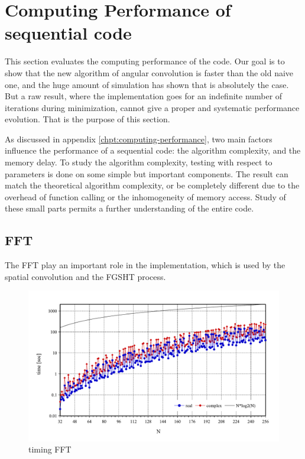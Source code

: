 
\chapter{Computing Performance of sequential code\label{chpt:seq-code-performance}}

This section evaluates the computing performance of the code. Our
goal is to show that the new algorithm of angular convolution is faster
than the old naive one, and the huge amount of simulation has shown
that is absolutely the case. But a raw result, where the implementation
goes for an indefinite number of iterations during minimization, cannot %
give a proper and systematic performance evolution. That is the 
purpose of this section. 

As discussed in appendix \ref{chpt:computing-performance}, two main
factors influence the performance of a sequential code: the
algorithm complexity, and the memory delay. To study the algorithm
complexity, testing with respect to parameters is done on some simple
but important components. The result can match the theoretical algorithm
complexity, or be completely different due to the overhead of function
calling or the inhomogeneity of memory access. Study of these small %
parts permits a further understanding of the entire code.

\section{FFT}

The \acs{FFT} play an important role in the implementation, which
is used by the spatial convolution and the \acs{FGSHT} process. 

\begin{figure}[H]
\begin{centering}
\includegraphics[bb=0bp 20bp 567bp 310bp,width=1\columnwidth]{_figure/results/fftw_timing}
\par\end{centering}
\caption{timing FFT\label{fig:timing-FFT}}
\end{figure}

